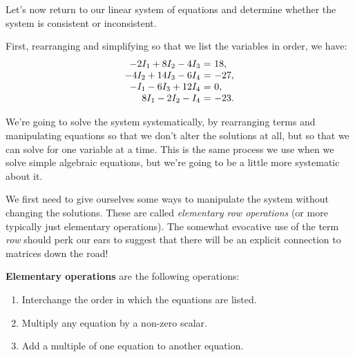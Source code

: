 \documentclass{ximera}
\begin{document}
\begin{exploration}
\begin{example}
\begin{remark}
  \end{remark}

\begin{solution}
  
  Let's now return to our linear system of equations and determine whether the system is consistent or inconsistent.

  First, rearranging and simplifying so that we list the variables in order, we have:
  \begin{equation*}
    \begin{array}{r@{~}c@{~}l}
      -2I_1+8I_2-4I_3&=&18, \\
      - 4I_2 + 14I_3 - 6I_4 &=& -27, \\
      -I_1 - 6I_3 + 12I_4 &=& 0, \\
      8I_1-2I_2 - I_4 &=& -23.
    \end{array}
  \end{equation*}

  We're going to solve the system systematically, by rearranging terms and manipulating equations so that we don't alter the solutions at all, but so that we can solve for one variable at a time. This is the same process we use when we solve simple algebraic equations, but we're going to be a little more systematic about it.

  \begin{remark}

  We first need to give ourselves some ways to manipulate the system without changing the solutions. These are called \emph{elementary row operations} (or more typically just elementary operations). The somewhat evocative use of the term \emph{row} should perk our ears to suggest that there will be an explicit connection to matrices down the road!

  \begin{definition}
    \textbf{Elementary operations}%
     are the
    following operations:
  
    \begin{enumerate}
    \item Interchange the order in which the equations are listed.
  
    \item Multiply any equation by a non-zero scalar.
  
    \item Add a multiple of one equation to another equation.
    \end{enumerate}
  \end{definition}


\end{remark}
\end{solution}
\end{example}
\end{exploration}
\end{document}
